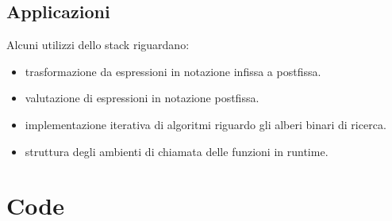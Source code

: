 \subsection{Applicazioni}
Alcuni utilizzi dello stack riguardano:
\begin{itemize}[noitemsep]
	\item trasformazione da espressioni in notazione infissa a postfissa.
	\item valutazione di espressioni in notazione postfissa.
	\item implementazione iterativa di algoritmi riguardo gli alberi binari di ricerca.
	\item struttura degli ambienti di chiamata delle funzioni in runtime.
\end{itemize}

\section{Code}